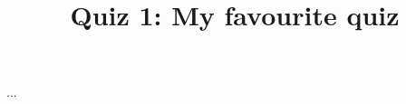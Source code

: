 \documentclass{webquiz}
\title{Quiz 1: My favourite quiz}
\begin{document}
  \begin{question}%
  \end{question}

  \begin{question}%
  \end{question}

  \begin{question}%
  \end{question}

  ...
\end{document}
